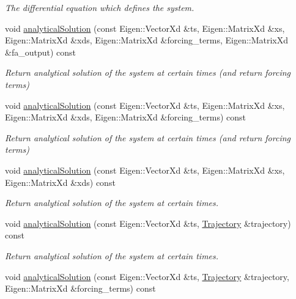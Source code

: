 \begin{DoxyCompactItemize}
\begin{DoxyCompactList}\small\item\em The differential equation which defines the system. \end{DoxyCompactList}\item 
void \hyperlink{classDmpBbo_1_1Dmp_ad62585b1e0bab2b9743782e15e01d694}{analytical\+Solution} (const Eigen\+::\+Vector\+Xd \&ts, Eigen\+::\+Matrix\+Xd \&xs, Eigen\+::\+Matrix\+Xd \&xds, Eigen\+::\+Matrix\+Xd \&forcing\+\_\+terms, Eigen\+::\+Matrix\+Xd \&fa\+\_\+output) const 
\begin{DoxyCompactList}\small\item\em Return analytical solution of the system at certain times (and return forcing terms) \end{DoxyCompactList}\item 
void \hyperlink{classDmpBbo_1_1Dmp_a636531b0dea01397d1338b19e0061360}{analytical\+Solution} (const Eigen\+::\+Vector\+Xd \&ts, Eigen\+::\+Matrix\+Xd \&xs, Eigen\+::\+Matrix\+Xd \&xds, Eigen\+::\+Matrix\+Xd \&forcing\+\_\+terms) const 
\begin{DoxyCompactList}\small\item\em Return analytical solution of the system at certain times (and return forcing terms) \end{DoxyCompactList}\item 
void \hyperlink{classDmpBbo_1_1Dmp_ab6600b58b35bc9e66673d16f68e2e919}{analytical\+Solution} (const Eigen\+::\+Vector\+Xd \&ts, Eigen\+::\+Matrix\+Xd \&xs, Eigen\+::\+Matrix\+Xd \&xds) const 
\begin{DoxyCompactList}\small\item\em Return analytical solution of the system at certain times. \end{DoxyCompactList}\item 
void \hyperlink{classDmpBbo_1_1Dmp_a9b6bbda07ecd4fc7b6c9de57e185ab05}{analytical\+Solution} (const Eigen\+::\+Vector\+Xd \&ts, \hyperlink{classDmpBbo_1_1Trajectory}{Trajectory} \&trajectory) const 
\begin{DoxyCompactList}\small\item\em Return analytical solution of the system at certain times. \end{DoxyCompactList}\item 
void \hyperlink{classDmpBbo_1_1Dmp_ae1e5218e7ebfedf7fb2501dc8af2675f}{analytical\+Solution} (const Eigen\+::\+Vector\+Xd \&ts, \hyperlink{classDmpBbo_1_1Trajectory}{Trajectory} \&trajectory, Eigen\+::\+Matrix\+Xd \&forcing\+\_\+terms) const 

\end{DoxyCompactItemize}
